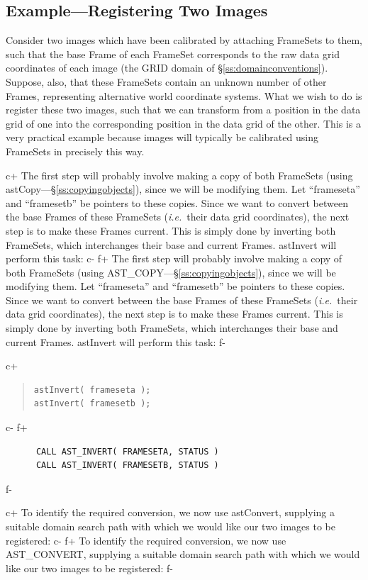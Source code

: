 \documentclass[twoside,11pt]{article}
\newcommand{\secref}[1]{\S\ref{#1}}
\newcommand{\secref}[1]{\ref{#1}}
\begin{document}
\subsection{\label{ss:registeringimages}Example---Registering Two Images}

Consider two images which have been calibrated by attaching FrameSets
to them, such that the base Frame of each FrameSet corresponds to the
raw data grid coordinates of each image (the GRID domain of
\secref{ss:domainconventions}). Suppose, also, that these FrameSets
contain an unknown number of other Frames, representing alternative
world coordinate systems.  What we wish to do is register these two
images, such that we can transform from a position in the data grid of
one into the corresponding position in the data grid of the other.
This is a very practical example because images will typically be
calibrated using FrameSets in precisely this way.

c+
The first step will probably involve making a copy of both FrameSets
(using astCopy---\secref{ss:copyingobjects}), since we will be
modifying them. Let ``frameseta'' and ``framesetb'' be pointers to
these copies. Since we want to convert between the base Frames of
these FrameSets ({\em{i.e.}}\ their data grid coordinates), the next
step is to make these Frames current. This is simply done by inverting
both FrameSets, which interchanges their base and current
Frames. astInvert will perform this task:
c-
f+
The first step will probably involve making a copy of both FrameSets
(using AST\_COPY---\secref{ss:copyingobjects}), since we will be
modifying them. Let ``frameseta'' and ``framesetb'' be pointers to
these copies. Since we want to convert between the base Frames of
these FrameSets ({\em{i.e.}}\ their data grid coordinates), the next
step is to make these Frames current. This is simply done by inverting
both FrameSets, which interchanges their base and current
Frames. astInvert will perform this task:
f-

c+
\begin{quote}
\small
\begin{verbatim}
astInvert( frameseta );
astInvert( framesetb );
\end{verbatim}
\normalsize
\end{quote}
c-
f+
\small
\begin{verbatim}
      CALL AST_INVERT( FRAMESETA, STATUS )
      CALL AST_INVERT( FRAMESETB, STATUS )
\end{verbatim}
\normalsize
f-

c+
To identify the required conversion, we now use astConvert, supplying
a suitable domain search path with which we would like our two images
to be registered:
c-
f+
To identify the required conversion, we now use AST\_CONVERT,
supplying a suitable domain search path with which we would like our
two images to be registered:
f-
\end{document}
